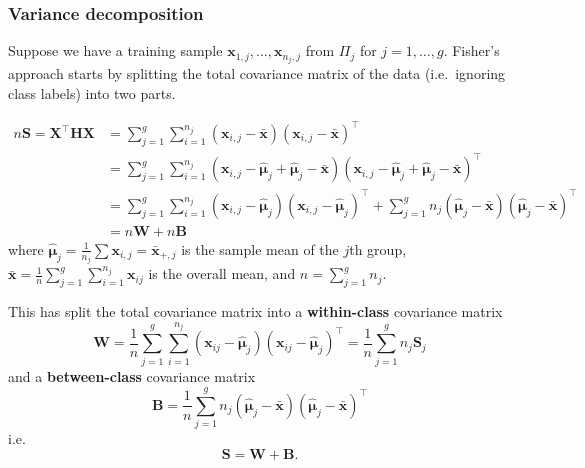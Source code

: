 \documentclass[
]{book}
\theoremstyle{definition}
\theoremstyle{definition}
\theoremstyle{definition}
\theoremstyle{definition}
\theoremstyle{remark}
\begin{document}
\subsubsection*{Variance decomposition}\label{variance-decomposition}

Suppose we have a training sample \(\mathbf x_{1,j}, \ldots, \mathbf x_{n_j,j}\) from \(\Pi_j\) for \(j=1,\ldots,g\).
Fisher's approach starts by splitting the total covariance matrix of the data (i.e.~ignoring class labels) into two parts.

\begin{align*}
n\mathbf S=\mathbf X^\top\mathbf H\mathbf X&= \sum_{j=1}^g\sum_{i=1}^{n_j} (\mathbf x_{i,j} - \bar{\mathbf x})(\mathbf x_{i,j} - \bar{\mathbf x})^\top\\
&=\sum_{j=1}^g\sum_{i=1}^{n_j} (\mathbf x_{i,j} - \hat{{\boldsymbol{\mu}}}_j+\hat{{\boldsymbol{\mu}}}_j-\bar{\mathbf x})(\mathbf x_{i,j} - \hat{{\boldsymbol{\mu}}}_j+\hat{{\boldsymbol{\mu}}}_j-\bar{\mathbf x})^\top\\
&= \sum_{j=1}^g\sum_{i=1}^{n_j} (\mathbf x_{i,j} - \hat{{\boldsymbol{\mu}}}_j)(\mathbf x_{i,j} - \hat{{\boldsymbol{\mu}}}_j)^\top+
\sum_{j=1}^g n_j (\hat{{\boldsymbol{\mu}}}_j-\bar{\mathbf x})(\hat{{\boldsymbol{\mu}}}_j-\bar{\mathbf x})^\top\\
&=n\mathbf W+n\mathbf B
\end{align*}
where \(\hat{{\boldsymbol{\mu}}}_j=\frac{1}{n_j} \sum \mathbf x_{i,j} = \bar{\mathbf x}_{+,j}\) is the sample mean of the \(j\)th group, \(\bar{\mathbf x} = \frac{1}{n} \sum_{j=1}^g \sum_{i=1}^{n_j}
\mathbf x_{ij}\) is the overall mean, and \(n=\sum_{j=1}^g n_j\).

This has split the total covariance matrix into a \textbf{within-class} covariance matrix
\[ \mathbf W= \frac{1}{n}\sum_{j=1}^g \sum_{i=1}^{n_j} (\mathbf x_{ij} - \hat{{\boldsymbol{\mu}}}_j) (\mathbf x_{ij} - \hat{{\boldsymbol{\mu}}}_j)^\top  = \frac{1}{n}\sum_{j=1}^g n_j \mathbf S_j \]
and a \textbf{between-class} covariance matrix
\[ \mathbf B= \frac{1}{n}\sum_{j=1}^g n_j (\hat{{\boldsymbol{\mu}}}_j - \bar{\mathbf x}) (\hat{{\boldsymbol{\mu}}}_j - \bar{\mathbf x})^\top\]
i.e.
\[\mathbf S= \mathbf W+ \mathbf B.\]
\end{document}
